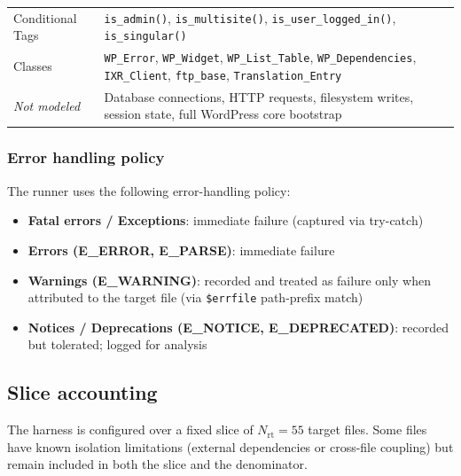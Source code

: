 \begin{table}[t]
\begin{tabularx}{\textwidth}{@{}>{\raggedright\arraybackslash}p{2.8cm}X@{}}
\rowcolor{rowB}
Conditional Tags &
\texttt{is\_admin()}, \texttt{is\_multisite()}, \texttt{is\_user\_logged\_in()}, \texttt{is\_singular()} \\
\rowcolor{rowA}
Classes &
\texttt{WP\_Error}, \texttt{WP\_Widget}, \texttt{WP\_List\_Table}, \texttt{WP\_Dependencies}, \texttt{IXR\_Client}, \texttt{ftp\_base}, \texttt{Translation\_Entry} \\
\midrule[0.8pt]
\rowcolor{rowB}
\textit{Not modeled} &
Database connections, HTTP requests, filesystem writes, session state, full WordPress core bootstrap \\
\bottomrule[1.5pt]
\end{tabularx}
\end{table}

\subsubsection{Error handling policy}
The runner uses the following error-handling policy:

\begin{itemize}
    \item \textbf{Fatal errors / Exceptions}: immediate failure (captured via try-catch)
    \item \textbf{Errors (E\_ERROR, E\_PARSE)}: immediate failure
    \item \textbf{Warnings (E\_WARNING)}: recorded and treated as failure only when attributed to the target file (via \texttt{\$errfile} path-prefix match)
    \item \textbf{Notices / Deprecations (E\_NOTICE, E\_DEPRECATED)}: recorded but tolerated; logged for analysis
\end{itemize}

\subsection{Slice accounting}
\label{appendix:slice-accounting}

The harness is configured over a fixed slice of $N_{\mathrm{rt}}=55$ target files.
Some files have known isolation limitations (external dependencies or cross-file coupling) but remain included in both the slice and the denominator.

